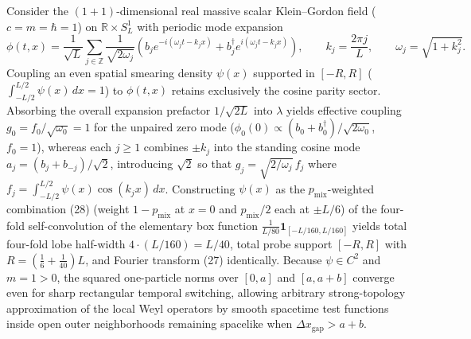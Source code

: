 \documentclass[11pt,letterpaper]{article}
\theoremstyle{definition}
\begin{document}
Consider the \((1+1)\)-dimensional real massive scalar Klein--Gordon
field (\(c = m = \hbar = 1\)) on \(\mathbb{R} \times S^1_L\) with
periodic mode expansion
\[\phi(t, x) = \frac{1}{\sqrt{L}} \sum_{j \in \mathbb{Z}} \frac{1}{\sqrt{2\omega_j}}\left(b_j e^{-i(\omega_j t - k_j x)} + b_j^\dagger e^{i(\omega_j t - k_j x)}\right), \qquad k_j = \frac{2\pi j}{L}, \qquad \omega_j = \sqrt{1 + k_j^2}.
\tag{E1}\] Coupling an even spatial smearing density \(\psi(x)\)
supported in \([-R, R]\) (\(\int_{-L/2}^{L/2}\psi(x)\,dx = 1\)) to
\(\phi(t, x)\) retains exclusively the cosine parity sector. Absorbing
the overall expansion prefactor \(1/\sqrt{2L}\) into \(\lambda\) yields
effective coupling \(g_0 = f_0/\sqrt{\omega_0} = 1\) for the unpaired
zero mode (\(\phi_0(0) \propto (b_0 + b_0^\dagger)/\sqrt{2\omega_0}\),
\(f_0 = 1\)), whereas each \(j \ge 1\) combines \(\pm k_j\) into the
standing cosine mode \(a_j = (b_j + b_{-j})/\sqrt{2}\), introducing
\(\sqrt{2}\) so that \(g_j = \sqrt{2/\omega_j}\,f_j\) where
\(f_j = \int_{-L/2}^{L/2}\psi(x)\cos(k_j x)\,dx\). Constructing
\(\psi(x)\) as the \(p_{\mathrm{mix}}\)-weighted combination (28)
(weight \(1 - p_{\mathrm{mix}}\) at \(x = 0\) and \(p_{\mathrm{mix}}/2\)
each at \(\pm L/6\)) of the four-fold self-convolution of the elementary
box function \(\frac{1}{L/80}\mathbf{1}_{[-L/160, L/160]}\) yields total
four-fold lobe half-width \(4 \cdot (L/160) = L/40\), total probe
support \([-R, R]\) with \(R = (\frac{1}{6} + \frac{1}{40})L\), and
Fourier transform (27) identically. Because \(\psi \in C^2\) and
\(m = 1 > 0\), the squared one-particle norms over \([0, a]\) and
\([a, a+b]\) converge even for sharp rectangular temporal switching,
allowing arbitrary strong-topology approximation of the local Weyl
operators by smooth spacetime test functions inside open outer
neighborhoods remaining spacelike when
\(\Delta x_{\mathrm{gap}} > a + b\).
\end{document}
